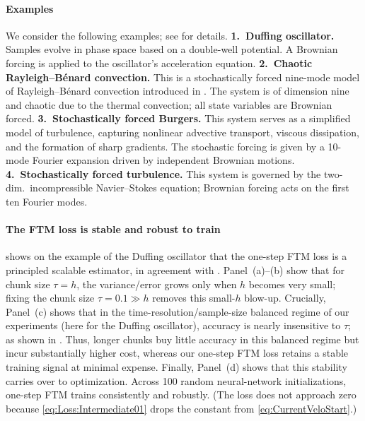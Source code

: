\documentclass[oneside,11pt]{article}
\theoremstyle{remark}
\begin{document}
\paragraph{Examples} We consider the following examples; see  for details. \textbf{1.\ Duffing oscillator.} Samples evolve in phase space based on a double-well potential. A Brownian forcing is  applied to the oscillator's acceleration equation. \textbf{2.\ Chaotic Rayleigh--Bénard convection.}  This is a  stochastically forced nine-mode model of Rayleigh--Bénard convection introduced in \cite{reiterer-lainscek-schuerrer-etal:1998}. The system is of dimension nine and chaotic due to the thermal convection;  all state variables are Brownian forced. \textbf{3.\ Stochastically forced Burgers.}  This system serves as a simplified model of turbulence, capturing nonlinear advective transport, viscous dissipation, and the formation of sharp gradients. The stochastic forcing is given by a 10-mode Fourier expansion driven by independent Brownian motions. \textbf{4.\ Stochastically forced turbulence.} This system is governed by the two-dim.\  incompressible Navier--Stokes equation;  Brownian forcing acts on the first ten Fourier modes. 










\paragraph{The FTM loss is stable and robust to train}
 shows on the example of the Duffing oscillator that the one-step FTM loss is a principled scalable estimator, in agreement with . Panel~(a)--(b) show that for chunk size $\tau=h$, the variance/error grows only when $h$ becomes very small; fixing the chunk size $\tau=0.1 \gg h$ removes this small-$h$ blow-up.  
Crucially, Panel~(c) shows that in the time-resolution/sample-size balanced regime of our experiments (here for the Duffing oscillator), accuracy is nearly insensitive to $\tau$; as shown in  . 
Thus, longer chunks buy little accuracy in this balanced regime but incur substantially higher cost, whereas our  one-step FTM loss retains a stable training signal at minimal expense. Finally, Panel~(d) shows that this stability carries over to optimization. Across 100 random neural-network initializations, one-step FTM trains consistently and robustly. (The loss does not approach zero because  \eqref{eq:Loss:Intermediate01} drops the constant from  \eqref{eq:CurrentVeloStart}.)
\end{document}
